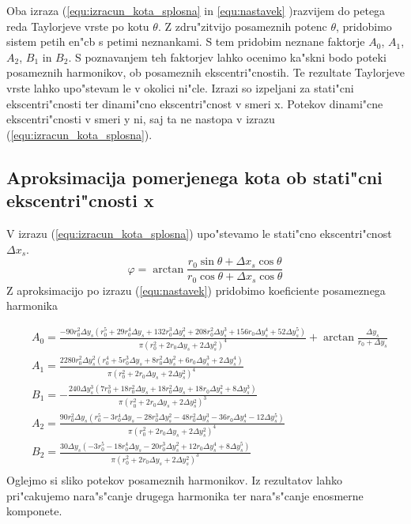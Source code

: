 Oba izraza (\ref{equ:izracun_kota_splosna} in \ref{equ:nastavek} )razvijem do petega reda Taylorjeve vrste  po kotu $\theta$. Z zdru"zitvijo posameznih potenc $\theta$, pridobimo sistem petih en"cb s petimi neznankami. S tem pridobim neznane faktorje $A_0$, $A_1$, $A_2$, $B_1$ in $B_2$. S poznavanjem teh faktorjev lahko ocenimo ka"skni bodo poteki posameznih harmonikov, ob posameznih ekscentri"cnostih. Te rezultate Taylorjeve vrste lahko upo"stevam le v okolici ni"cle. Izrazi so izpeljani za stati"cni ekscentri"cnosti ter dinami"cno ekscentri"cnost v smeri x. Potekov dinami"cne ekscentri"cnosti v smeri y ni, saj ta ne nastopa v izrazu (\ref{equ:izracun_kota_splosna}).
\subsection{Aproksimacija pomerjenega kota ob stati"cni ekscentri"cnosti x}
V izrazu (\ref{equ:izracun_kota_splosna}) upo"stevamo le stati"cno ekscentri"cnost $\Delta x_s$.
\begin{equation}
\label{equ:izracun_kota_xs}
\varphi=\arctan \frac{r_0 \sin\theta +\Delta x_s \cos\theta}{r_0 \cos\theta +\Delta x_s \cos\theta}
\end{equation}
Z aproksimacijo po izrazu (\ref{equ:nastavek}) pridobimo koeficiente posameznega harmonika

\begin{eqnarray}
&A_0=\frac{-90 r_0^2  \Delta y_s (r_0^5+29 r_0^4 \Delta y_s+132 r_0^3  \Delta y_s^2+208 r_0 ^2  \Delta y_s^3+156 r_0  \Delta y_s^4+52 \Delta y_s^5)}{\pi (r_0^2+2 r_0 \Delta y_s+2 \Delta y_s^2)^4}+\arctan \frac{ \Delta y_s}{r_0+ \Delta y_s}\\
&A_1=\frac{2280 r_0^2  \Delta y_s^2(r_0^4+5 r_0^3  \Delta y_s+8 r_0^2  \Delta y_s^2+6 r_0  \Delta y_s^3+2 \Delta y_s^4)}{\pi(r_0^2+2 r_0 \Delta y_s+2 \Delta y_s^2)^4}\\
&B_1=-\frac{240 \Delta y_s^3(7r_0^3+18 r_0^2  \Delta y_s+18 r_0^2  \Delta y_s+18 r_0  \Delta y_s^2+8 \Delta y_s^3)}{\pi(r_0^2+2 r_0 \Delta y_s+2 \Delta y_s^2)^3}\\
&A_2=\frac{90 r_0^2  \Delta y_s (r_0^5-3 r_0^4 \Delta y_s-28 r_0^3  \Delta y_s^2-48r_0 ^2  \Delta y_s^3-36 r_0  \Delta y_s^4-12 \Delta y_s^5)}{\pi(r_0^2+2 r_0 \Delta y_s+2 \Delta y_s^2)^4}\\
&B_2=\frac{30 \Delta y_s (-3r_0^5-18 r_0^4 \Delta y_s-20 r_0^3  \Delta y_s^2 +12 r_0  \Delta y_s^4+8 \Delta y_s^5)}{\pi(r_0^2+2 r_0 \Delta y_s+2 \Delta y_s^2)^3}\\
\end{eqnarray}
Oglejmo si sliko potekov posameznih harmonikov.
Iz rezultatov lahko pri"cakujemo nara"s"canje drugega harmonika ter nara"s"canje enosmerne komponete.
